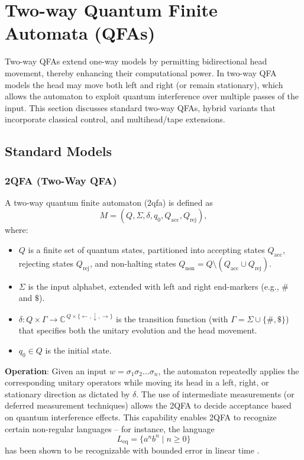 \section{Two-way Quantum Finite Automata (QFAs)}
\label{sec:two-way-qfas}

Two-way QFAs extend one-way models by permitting bidirectional head movement, thereby enhancing their computational power. In two-way QFA models the head may move both left and right (or remain stationary), which allows the automaton to exploit quantum interference over multiple passes of the input. This section discusses standard two-way QFAs, hybrid variants that incorporate classical control, and multihead/tape extensions.

\subsection{Standard Models}
\label{subsec:two-way-standard}

\subsubsection{2QFA (Two-Way QFA)}
\label{sssec:2qfa}
\begin{definition}[2QFA]
A two-way quantum finite automaton (\gls{2qfa}) is defined as 
\[
M = (Q, \Sigma, \delta, q_0, Q_{\text{acc}}, Q_{\text{rej}}),
\]
where:
\begin{itemize}
    \item \( Q \) is a finite set of quantum states, partitioned into accepting states \( Q_{\text{acc}} \), rejecting states \( Q_{\text{rej}} \), and non-halting states \( Q_{\text{non}} = Q \setminus (Q_{\text{acc}} \cup Q_{\text{rej}}) \).
    \item \( \Sigma \) is the input alphabet, extended with left and right end-markers (e.g., \( \# \) and \( \$ \)).
    \item \( \delta: Q \times \Gamma \to \mathbb{C}^{\, Q \times \{ \leftarrow, \downarrow, \rightarrow \}} \) is the transition function (with \( \Gamma = \Sigma \cup \{ \#, \$ \} \)) that specifies both the unitary evolution and the head movement.
    \item \( q_0 \in Q \) is the initial state.
\end{itemize}
\end{definition}

\textbf{Operation}:  
Given an input \( w = \sigma_1\sigma_2\ldots\sigma_n \), the automaton repeatedly applies the corresponding unitary operators while moving its head in a left, right, or stationary direction as dictated by \(\delta\). The use of intermediate measurements (or deferred measurement techniques) allows the 2QFA to decide acceptance based on quantum interference effects. This capability enables 2QFA to recognize certain non-regular languages – for instance, the language 
\[
L_{\text{eq}} = \{a^n b^n \mid n \geq 0\}
\]
has been shown to be recognizable with bounded error in linear time \cite{kondacs1997power, yakaryilmaz2010succinctness}.

